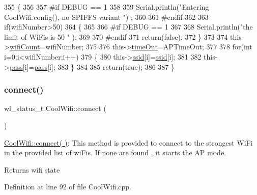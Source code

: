 \begin{DoxyCode}
355 \{
356 
357 \textcolor{preprocessor}{#if DEBUG == 1 }
358     
359     Serial.println(\textcolor{stringliteral}{"Entering CoolWifi.config(), no SPIFFS variant "}) ;
360     
361 \textcolor{preprocessor}{#endif}
362     
363     \textcolor{keywordflow}{if}(wifiNumber>50)
364     \{
365     
366 \textcolor{preprocessor}{    #if DEBUG == 1 }
367         
368         Serial.println(\textcolor{stringliteral}{"the limit of WiFis is 50 "} );
369         
370 \textcolor{preprocessor}{    #endif}
371         \textcolor{keywordflow}{return}(\textcolor{keyword}{false});  
372     \}
373 
374     this->\hyperlink{classCoolWifi_ab133bd92fcb895b884deecd6678592e4}{wifiCount}=wifiNumber;
375 
376     this->\hyperlink{classCoolWifi_a952111605f25156588b5632caaba1c6f}{timeOut}=APTimeOut;
377     
378     \textcolor{keywordflow}{for}(\textcolor{keywordtype}{int} i=0;i<wifiNumber;i++)
379     \{
380         this->\hyperlink{classCoolWifi_a893b21d0fed821438733bba2e73fb4c2}{ssid}[i]=\hyperlink{classCoolWifi_a893b21d0fed821438733bba2e73fb4c2}{ssid}[i];
381         
382         this->\hyperlink{classCoolWifi_a0c3332a149245aaad060b32593a54c9b}{pass}[i]=\hyperlink{classCoolWifi_a0c3332a149245aaad060b32593a54c9b}{pass}[i];
383     \}
384         
385     \textcolor{keywordflow}{return}(\textcolor{keyword}{true});
386 
387 \}
\end{DoxyCode}
\mbox{\label{classCoolWifi_ad060353050f40d032a2dbf9e54a768bf}} 
\subsubsection{\texorpdfstring{connect()}{connect()}}
{\footnotesize\ttfamily wl\+\_\+status\+\_\+t Cool\+Wifi\+::connect (\begin{DoxyParamCaption}{ }\end{DoxyParamCaption})}

\hyperlink{classCoolWifi_ad060353050f40d032a2dbf9e54a768bf}{Cool\+Wifi\+::connect( )}\+: This method is provided to connect to the strongest Wi\+Fi in the provided list of wi\+Fis. If none are found , it starts the AP mode.

\begin{DoxyReturn}{Returns}
wifi state 
\end{DoxyReturn}


Definition at line 92 of file Cool\+Wifi.\+cpp.



